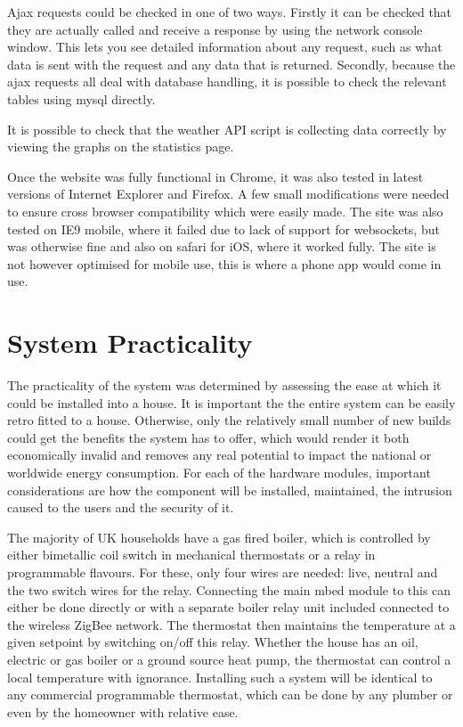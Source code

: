 \documentclass[10.5pt,a4paper,twoside]{report}   %
\begin{document}
Ajax requests could be checked in one of two ways. Firstly it can be checked that they are actually called and receive a response by using the network console window. This lets you see detailed information about any request, such as what data is sent with the request and any data that is returned. Secondly, because the ajax requests all deal with database handling, it is possible to check the relevant tables using mysql directly.

It is possible to check that the weather API script is collecting data correctly by viewing the graphs on the statistics page.

Once the website was fully functional in Chrome, it was also tested in latest versions of Internet Explorer and Firefox. A few small modifications were needed to ensure cross browser compatibility which were easily made. The site was also tested on IE9 mobile, where it failed due to lack of support for websockets, but was otherwise fine and also on safari for iOS, where it worked fully. The site is not however optimised for mobile use, this is where a phone app would come in use.
\section{System Practicality}
The practicality of the system was determined by assessing the ease at which it could be installed into a house. It is important the the entire system can be easily retro fitted to a house. Otherwise, only the relatively small number of new builds could get the benefits the system has to offer, which would render it both economically invalid and removes any real potential to impact the national or worldwide energy consumption. For each of the hardware modules, important considerations are how the component will be installed, maintained, the intrusion caused to the users and the security of it.     

The majority of UK households have a gas fired boiler, which is controlled by either bimetallic coil switch in mechanical thermostats or a relay in programmable flavours. For these, only four wires are needed: live, neutral and the two switch wires for the relay. Connecting the main mbed module to this can either be done directly or with a separate boiler relay unit included connected to the wireless ZigBee network. The thermostat then maintains the temperature at a given setpoint by switching on/off this relay. Whether the house has an oil, electric or gas boiler or a ground source heat pump, the thermostat can control a local temperature with ignorance. Installing such a system will be identical to any commercial programmable thermostat, which can be done by any plumber or even by the homeowner with relative ease.
\end{document}
